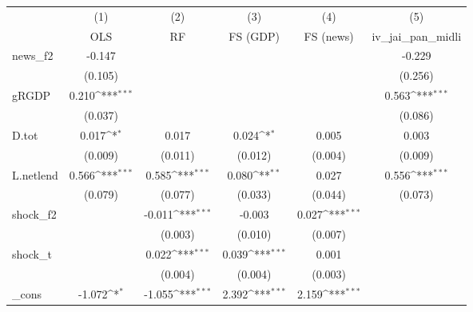 {
\def\sym#1{\ifmmode^{#1}\else\(^{#1}\)\fi}
\begin{tabular}{l*{5}{c}}
\toprule
            &\multicolumn{1}{c}{(1)}&\multicolumn{1}{c}{(2)}&\multicolumn{1}{c}{(3)}&\multicolumn{1}{c}{(4)}&\multicolumn{1}{c}{(5)}\\
            &\multicolumn{1}{c}{OLS}&\multicolumn{1}{c}{RF}&\multicolumn{1}{c}{FS (GDP)}&\multicolumn{1}{c}{FS (news)}&\multicolumn{1}{c}{iv\_jai\_pan\_midli}\\
\midrule
news\_f2     &      -0.147         &                     &                     &                     &      -0.229         \\
            &     (0.105)         &                     &                     &                     &     (0.256)         \\
\addlinespace
gRGDP       &       0.210\sym{***}&                     &                     &                     &       0.563\sym{***}\\
            &     (0.037)         &                     &                     &                     &     (0.086)         \\
\addlinespace
D.tot       &       0.017\sym{*}  &       0.017         &       0.024\sym{*}  &       0.005         &       0.003         \\
            &     (0.009)         &     (0.011)         &     (0.012)         &     (0.004)         &     (0.009)         \\
\addlinespace
L.netlend   &       0.566\sym{***}&       0.585\sym{***}&       0.080\sym{**} &       0.027         &       0.556\sym{***}\\
            &     (0.079)         &     (0.077)         &     (0.033)         &     (0.044)         &     (0.073)         \\
\addlinespace
shock\_f2    &                     &      -0.011\sym{***}&      -0.003         &       0.027\sym{***}&                     \\
            &                     &     (0.003)         &     (0.010)         &     (0.007)         &                     \\
\addlinespace
shock\_t     &                     &       0.022\sym{***}&       0.039\sym{***}&       0.001         &                     \\
            &                     &     (0.004)         &     (0.004)         &     (0.003)         &                     \\
\addlinespace
\_cons      &      -1.072\sym{*}  &      -1.055\sym{***}&       2.392\sym{***}&       2.159\sym{***}&                     \\

\end{tabular}}
